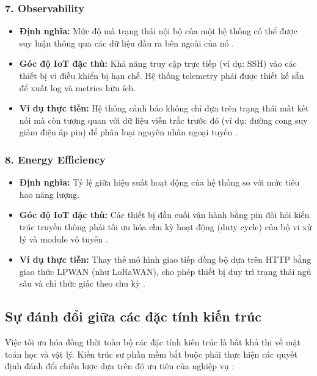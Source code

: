 \subsubsection*{7. Observability}
\begin{itemize}
    \item \textbf{Định nghĩa:} Mức độ mà trạng thái nội bộ của một hệ thống có thể được suy luận thông qua các dữ liệu đầu ra bên ngoài của nó \cite{garrison2017}.
    \item \textbf{Góc độ IoT đặc thù:} Khả năng truy cập trực tiếp (ví dụ: SSH) vào các thiết bị vi điều khiển bị hạn chế. Hệ thống telemetry phải được thiết kế sẵn để xuất log và metrics hữu ích.
    \item \textbf{Ví dụ thực tiễn:} Hệ thống cảnh báo không chỉ dựa trên trạng thái mất kết nối mà còn tương quan với dữ liệu viễn trắc trước đó (ví dụ: đường cong suy giảm điện áp pin) để phân loại nguyên nhân ngoại tuyến \cite{ms_rollsroyce}.
\end{itemize}

\subsubsection*{8. Energy Efficiency}
\begin{itemize}
    \item \textbf{Định nghĩa:} Tỷ lệ giữa hiệu suất hoạt động của hệ thống so với mức tiêu hao năng lượng.
    \item \textbf{Góc độ IoT đặc thù:} Các thiết bị đầu cuối vận hành bằng pin đòi hỏi kiến trúc truyền thông phải tối ưu hóa chu kỳ hoạt động (duty cycle) của bộ vi xử lý và module vô tuyến \cite{lea2018}.
    \item \textbf{Ví dụ thực tiễn:} Thay thế mô hình giao tiếp đồng bộ dựa trên HTTP bằng giao thức LPWAN (như LoRaWAN), cho phép thiết bị duy trì trạng thái ngủ sâu và chỉ thức giấc theo chu kỳ \cite{lea2018}.
\end{itemize}

\subsection{Sự đánh đổi giữa các đặc tính kiến trúc}

Việc tối ưu hóa đồng thời toàn bộ các đặc tính kiến trúc là bất khả thi về mặt toán học và vật lý. Kiến trúc sư phần mềm bắt buộc phải thực hiện các quyết định đánh đổi chiến lược dựa trên độ ưu tiên của nghiệp vụ \cite{richards2020}:

